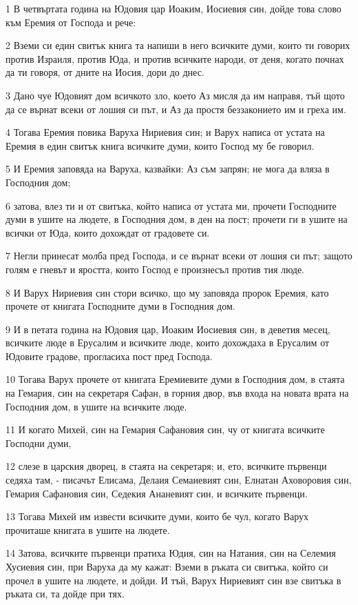 \par 1 В четвъртата година на Юдовия цар Иоаким, Иосиевия син, дойде това слово към Еремия от Господа и рече:
\par 2 Вземи си един свитък книга та напиши в него всичките думи, които ти говорих против Израиля, против Юда, и против всичките народи, от деня, когато почнах да ти говоря, от дните на Иосия, дори до днес.
\par 3 Дано чуе Юдовият дом всичкото зло, което Аз мисля да им направя, тъй щото да се върнат всеки от лошия си път, и Аз да простя беззаконието им и греха им.
\par 4 Тогава Еремия повика Варуха Нириевия син; и Варух написа от устата на Еремия в един свитък книга всичките думи, които Господ му бе говорил.
\par 5 И Еремия заповяда на Варуха, казвайки: Аз съм запрян; не мога да вляза в Господния дом;
\par 6 затова, влез ти и от свитъка, който написа от устата ми, прочети Господните думи в ушите на людете, в Господния дом, в ден на пост; прочети ги в ушите на всички от Юда, които дохождат от градовете си.
\par 7 Негли принесат молба пред Господа, и се върнат всеки от лошия си път; защото голям е гневът и яростта, които Господ е произнесъл против тия люде.
\par 8 И Варух Нириевия син стори всичко, що му заповяда пророк Еремия, като прочете от книгата Господните думи в Господния дом.
\par 9 И в петата година на Юдовия цар, Иоаким Иосиевия син, в деветия месец, всичките люде в Ерусалим и всичките люде, които дохождаха в Ерусалим от Юдовите градове, прогласиха пост пред Господа.
\par 10 Тогава Варух прочете от книгата Еремиевите думи в Господния дом, в стаята на Гемария, син на секретаря Сафан, в горния двор, във входа на новата врата на Господния дом, в ушите на всичките люде.
\par 11 И когато Михей, син на Гемария Сафановия син, чу от книгата всичките Господни думи,
\par 12 слезе в царския дворец, в стаята на секретаря; и, ето, всичките първенци седяха там, - писачът Елисама, Делаия Семаиевият син, Елнатан Аховоровия син, Гемария Сафановия син, Седекия Ананевият син, и всичките първенци.
\par 13 Тогава Михей им извести всичките думи, които бе чул, когато Варух прочиташе книгата в ушите на людете.
\par 14 Затова, всичките първенци пратиха Юдия, син на Натания, син на Селемия Хусиевия син, при Варуха да му кажат: Вземи в ръката си свитъка, който си прочел в ушите на людете, и дойди. И тъй, Варух Нириевият син взе свитъка в ръката си, та дойде при тях.
